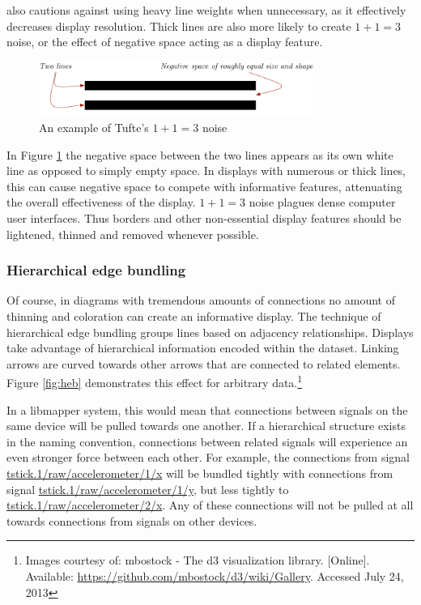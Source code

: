  also cautions against using heavy line weights when unnecessary, as it effectively decreases display resolution. Thick lines are also more likely to create $1 + 1 = 3$ noise, or the effect of negative space acting as a display feature.

\begin{figure}[ht]
\centering
	\includegraphics[width=0.8\textwidth]{figures/1and1equals3}
\caption{An example of Tufte's $1 + 1 = 3$ noise}
\label{fig:1and1equals3}
\end{figure}

In Figure \ref{fig:1and1equals3} the negative space between the two lines appears as its own white line as opposed to simply empty space. In displays with numerous or thick lines, this can cause negative space to compete with informative features, attenuating the overall effectiveness of the display. $1 + 1 = 3$ noise plagues dense computer user interfaces. Thus borders and other non-essential display features should be lightened, thinned and removed whenever possible.

	\subsubsection{Hierarchical edge bundling}

Of course, in diagrams with tremendous amounts of connections no amount of thinning and coloration can create an informative display. The technique of hierarchical edge bundling \cite{HEB} groups lines based on adjacency relationships. Displays take advantage of hierarchical information encoded within the dataset. Linking arrows are curved towards other arrows that are connected to related elements. Figure \ref{fig:heb} demonstrates this effect for arbitrary data.\footnote{Images courtesy of: mbostock - The d3 visualization library. [Online]. Available: \url{https://github.com/mbostock/d3/wiki/Gallery}. Accessed July 24, 2013} 

In a libmapper system, this would mean that connections between signals on the same device will be pulled towards one another. If a hierarchical structure exists in the naming convention, connections between related signals will experience an even stronger force between each other. For example, the connections from signal \url{tstick.1/raw/accelerometer/1/x} will be bundled tightly with connections from signal \url{tstick.1/raw/accelerometer/1/y}, but less tightly to \url{tstick.1/raw/accelerometer/2/x}. Any of these connections will not be pulled at all towards connections from signals on other devices.


